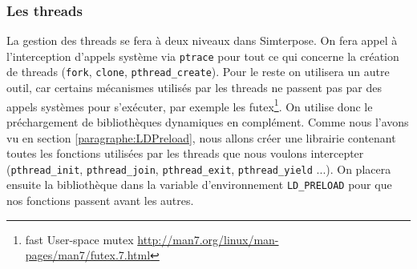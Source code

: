 \subsubsection{Les threads}

La gestion des threads se fera à deux niveaux dans Simterpose. On fera appel à l'interception d'appels système via \texttt{ptrace} pour tout ce qui concerne la création de threads (\texttt{fork}, \texttt{clone}, \texttt{pthread\_create}). Pour le reste on utilisera un autre outil, car certains mécanismes utilisés par les threads ne passent pas par des appels systèmes pour s'exécuter, par exemple les futex\footnote{fast User-space mutex \url{http://man7.org/linux/man-pages/man7/futex.7.html}}. On utilise donc le préchargement de bibliothèques dynamiques en complément. Comme nous l'avons vu en section \ref{paragraphe:LDPreload}, nous allons créer une librairie contenant toutes les fonctions utilisées par les threads que nous voulons intercepter (\texttt{pthread\_init}, \texttt{pthread\_join}, \texttt{pthread\_exit}, \texttt{pthread\_yield} ...). On placera ensuite la bibliothèque dans la variable d'environnement \texttt{LD\_PRELOAD} pour que nos fonctions passent avant les autres.


